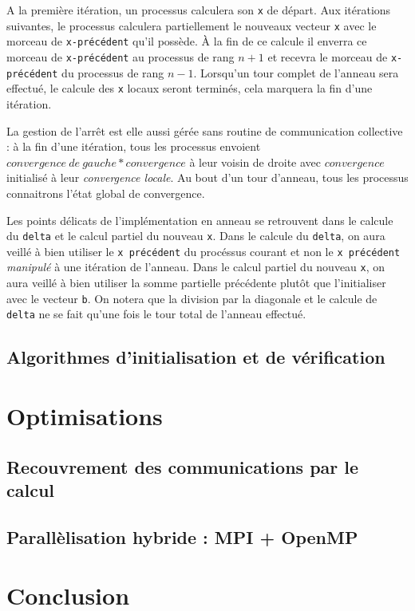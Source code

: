 \documentclass[a4paper]{article}
\begin{document}
A la première itération, un processus calculera son \texttt{x} de départ. Aux
itérations suivantes, le processus calculera partiellement le nouveaux vecteur
\texttt{x} avec le morceau de \texttt{x-précédent} qu'il possède. À la fin de 
ce calcule il enverra ce morceau de \texttt{x-précédent} au processus de rang
$n + 1$ et recevra le morceau de \texttt{x-précédent} du processus de rang
$n - 1$. Lorsqu'un tour complet de l'anneau sera effectué, le calcule des 
\texttt{x} locaux seront terminés, cela marquera la fin d'une itération.

La gestion de l'arrêt est elle aussi gérée sans routine de communication 
collective : à la fin d'une itération, tous les processus envoient 
$convergence~de~gauche * convergence$ à leur voisin de droite avec $convergence$
initialisé à leur \emph{convergence locale}. Au bout d'un tour d'anneau, tous
les processus connaitrons l'état global de convergence.

Les points délicats de l'implémentation en anneau se retrouvent dans le 
calcule du \texttt{delta} et le calcul partiel du nouveau \texttt{x}. Dans le 
calcule du \texttt{delta}, on aura veillé à bien utiliser le \texttt{x précédent}
du procéssus courant et non le \texttt{x précédent} \emph{manipulé} à une itération
de l'anneau. Dans le calcul partiel du nouveau \texttt{x}, on aura veillé à bien
utiliser la somme partielle précédente plutôt que l'initialiser avec le vecteur
\texttt{b}. On notera que la division par la diagonale et le calcule de 
\texttt{delta} ne se fait qu'une fois le tour total de l'anneau effectué.

\subsection{Algorithmes d'initialisation et de vérification}

\section{Optimisations}

\subsection{Recouvrement des communications par le calcul}

\subsection{Parallèlisation hybride : MPI + OpenMP}

\section{Conclusion}
\end{document}
